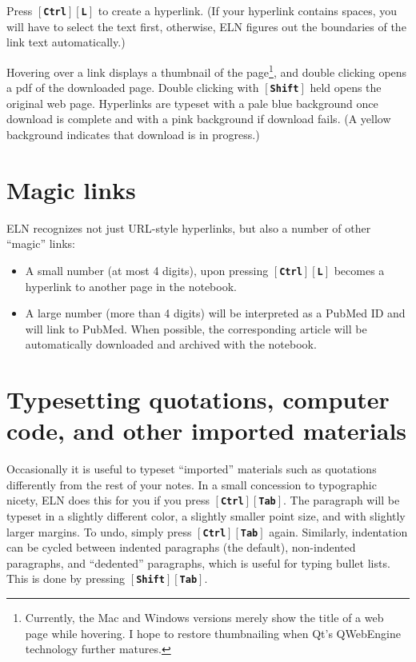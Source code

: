\documentclass[11pt]{report}
\def\keystroke#1{$\left[\right.\!${\tt\bfseries #1}$\!\left.\right]$}
\def\key#1{\keystroke{#1}}
\def\keycombo#1#2{\keystroke{#1}\keystroke{#2}}
\def\keycontrol#1{\keycombo{Ctrl}{#1}}
\def\keyshift#1{\keycombo{Shift}{#1}}
\begin{document}
Press \keycontrol{L} to create a hyperlink. (If your hyperlink
contains spaces, you will have to select the text first, otherwise,
ELN figures out the boundaries of the link text automatically.)

Hovering over a link displays a thumbnail of the
page\footnote{Currently, the Mac and Windows versions merely show the
  title of a web page while hovering. I hope to restore thumbnailing
  when Qt's QWebEngine technology further matures.}, and double
clicking opens a pdf of the downloaded page. Double clicking with
\key{Shift} held opens the original web page. Hyperlinks are typeset
with a pale blue background once download is complete and with a pink
background if download fails. (A yellow background indicates that
download is in progress.)

\section{Magic links}

ELN recognizes not just URL-style hyperlinks, but also a number of
other ``magic'' links:
\begin{itemize}
\item A small number (at most 4 digits), upon pressing \keycontrol{L}
becomes a hyperlink to another page in the notebook.
\item A large number (more than 4 digits)
will be interpreted as a PubMed ID and will link to PubMed. When
possible, the corresponding article will be automatically downloaded
and archived with the notebook. 
\end{itemize}

\section{Typesetting quotations, computer code, and other imported materials}

Occasionally it is useful to typeset ``imported'' materials such as
quotations differently from the rest of your notes. In a small
concession to typographic nicety, ELN does this for you if you press
\keycontrol{Tab}.  The paragraph will be typeset in a slightly
different color, a slightly smaller point size, and with slightly
larger margins. To undo, simply press \keycontrol{Tab}
again. Similarly, indentation can be cycled between indented
paragraphs (the default), non-indented paragraphs, and ``dedented''
paragraphs, which is useful for typing bullet lists. This is done by
pressing \keyshift{Tab}.
\end{document}
